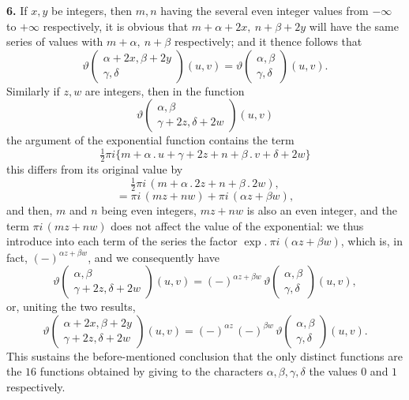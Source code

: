 \documentclass[11pt]{article}
\begin{document}
\textbf{6.} If $x,y$ be integers, then $m,n$ having the several even integer values from $-\infty$ to $+\infty$ respectively, it is obvious that $m + \alpha + 2x,\ n + \beta + 2y$ will have the same series of values with $m + \alpha,\ n + \beta$ respectively; and it thence follows that
\[
\vartheta\!\begin{pmatrix} \alpha + 2x,\beta + 2y \\ \gamma,\delta \end{pmatrix}\!(u,v) = \vartheta\!\begin{pmatrix} \alpha,\beta \\ \gamma,\delta \end{pmatrix}\!(u,v).
\]
Similarly if $z,w$ are integers, then in the function
\[
\vartheta\!\begin{pmatrix} \alpha,\beta \\ \gamma + 2z,\delta + 2w \end{pmatrix}\!(u,v)
\]
the argument of the exponential function contains the term
\[
\tfrac{1}{2}\pi i\bigl\{m + \alpha\mathbin{.}u + \gamma + 2z + n + \beta\mathbin{.}v + \delta + 2w\bigr\}
\]
this differs from its original value by
\[
\tfrac{1}{2}\pi i\,(m + \alpha\mathbin{.}2z + n + \beta\mathbin{.}2w),
\]
\[
= \pi i\,(mz + nw) + \pi i\,(\alpha z + \beta w),
\]
and then, $m$ and $n$ being even integers, $mz + nw$ is also an even integer, and the term $\pi i\,(mz + nw)$ does not affect the value of the exponential: we thus introduce into each term of the series the factor $\exp.\ \pi i\,(\alpha z + \beta w)$, which is, in fact, $(-)^{\alpha z + \beta w}$, and we consequently have
\[
\vartheta\!\begin{pmatrix} \alpha,\beta \\ \gamma + 2z,\delta + 2w \end{pmatrix}\!(u,v) = (-)^{\alpha z + \beta w}\,\vartheta\!\begin{pmatrix} \alpha,\beta \\ \gamma,\delta \end{pmatrix}\!(u,v),
\]
or, uniting the two results,
\[
\vartheta\!\begin{pmatrix} \alpha + 2x,\beta + 2y \\ \gamma + 2z,\delta + 2w \end{pmatrix}\!(u,v) = (-)^{\alpha z}\,(-)^{\beta w}\,\vartheta\!\begin{pmatrix} \alpha,\beta \\ \gamma,\delta \end{pmatrix}\!(u,v).
\]
This sustains the before-mentioned conclusion that the only distinct functions are the $16$ functions obtained by giving to the characters $\alpha,\beta,\gamma,\delta$ the values $0$ and $1$ respectively.
\end{document}
